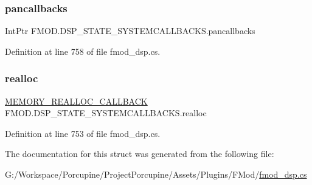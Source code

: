 \subsubsection{\texorpdfstring{pancallbacks}{pancallbacks}}
{\footnotesize\ttfamily Int\+Ptr F\+M\+O\+D.\+D\+S\+P\+\_\+\+S\+T\+A\+T\+E\+\_\+\+S\+Y\+S\+T\+E\+M\+C\+A\+L\+L\+B\+A\+C\+K\+S.\+pancallbacks}



Definition at line 758 of file fmod\+\_\+dsp.\+cs.

\mbox{\label{struct_f_m_o_d_1_1_d_s_p___s_t_a_t_e___s_y_s_t_e_m_c_a_l_l_b_a_c_k_s_a476908e93031d2e73a1d2ddfa3dd252c}} 
\subsubsection{\texorpdfstring{realloc}{realloc}}
{\footnotesize\ttfamily \hyperlink{namespace_f_m_o_d_a3d035f4158c569e31902d9ad59ab43f0}{M\+E\+M\+O\+R\+Y\+\_\+\+R\+E\+A\+L\+L\+O\+C\+\_\+\+C\+A\+L\+L\+B\+A\+CK} F\+M\+O\+D.\+D\+S\+P\+\_\+\+S\+T\+A\+T\+E\+\_\+\+S\+Y\+S\+T\+E\+M\+C\+A\+L\+L\+B\+A\+C\+K\+S.\+realloc}



Definition at line 753 of file fmod\+\_\+dsp.\+cs.



The documentation for this struct was generated from the following file\+:\begin{DoxyCompactItemize}
\item 
G\+:/\+Workspace/\+Porcupine/\+Project\+Porcupine/\+Assets/\+Plugins/\+F\+Mod/\hyperlink{fmod__dsp_8cs}{fmod\+\_\+dsp.\+cs}\end{DoxyCompactItemize}
